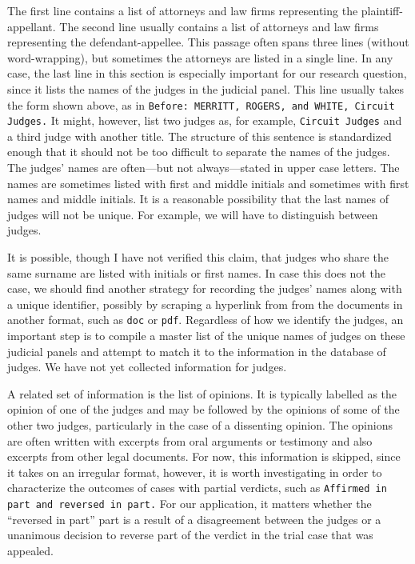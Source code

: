 \documentclass[11pt]{paper}
\begin{document}
The first line contains a list of attorneys and law firms representing the 
plaintiff-appellant. 
The second line usually contains a list of attorneys and law firms representing
the defendant-appellee. 
This passage often spans three lines (without word-wrapping), but sometimes 
the attorneys are listed in a single line.
In any case, the last line in this section is especially important for our 
research question, since it lists the names of the judges in the judicial 
panel. 
This line usually takes the form shown above, as in 
\texttt{Before: MERRITT, ROGERS, and WHITE, Circuit Judges.}
It might, however, list two judges as, for example, \texttt{Circuit Judges}
and a third judge with another title. 
The structure of this sentence is standardized enough that it should not be 
too difficult to separate the names of the judges. 
The judges' names are often---but not always---stated in upper case letters. 
The names are sometimes listed with first and middle initials
and sometimes with first names and middle initials. 
It is a reasonable possibility that the last names of judges will not be 
unique. 
For example, we will have to distinguish between judges.

It is possible, though I have not verified this claim, that judges who 
share the same surname are listed with initials or first names. 
In case this does not the case, we should find another strategy for recording 
the judges' names along with a unique identifier, 
possibly by scraping a hyperlink from from the documents in another format, 
such as \texttt{doc} or  \texttt{pdf}. 
Regardless of how we identify the judges, an important step is to compile a 
master list of the unique names of judges on these judicial panels and 
attempt to match it to the information in the database of judges. 
We have not yet collected information for judges. 

A related set of information is the list of opinions.  
It is typically labelled as the opinion of one of the judges and may be 
followed by the opinions of some of the other two judges, particularly in 
the case of a dissenting opinion. 
The opinions are often written with excerpts from oral arguments or testimony
and also excerpts from other legal documents. 
For now, this information is skipped, since it takes on an irregular format, 
however, it is worth investigating in order to characterize 
the outcomes of cases with partial verdicts, 
such as \texttt{Affirmed in part and reversed in part.}
For our application, it matters whether the ``reversed in part'' part is 
a result of a disagreement between the judges or a unanimous decision to 
reverse part of the verdict in the trial case that was appealed. 
\end{document}
